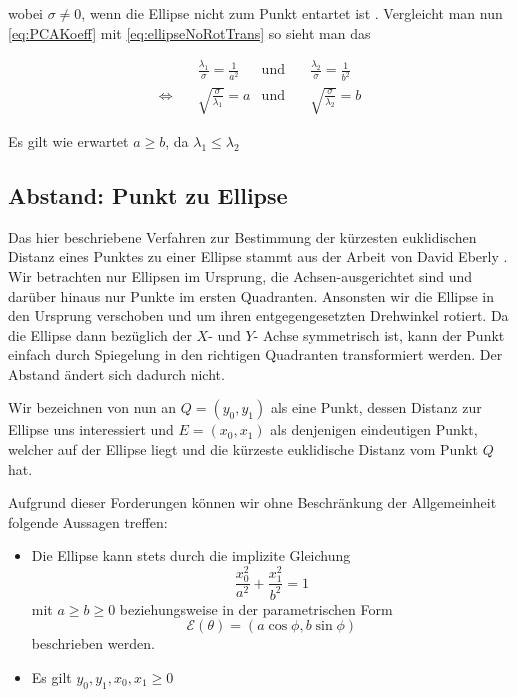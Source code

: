wobei $\sigma \neq 0$, wenn die Ellipse nicht zum Punkt entartet ist \cite{Lawrence1972}. Vergleicht man nun \ref{eq:PCAKoeff} mit \ref{eq:ellipseNoRotTrans} so sieht man das

\begin{equation}
\begin{aligned}
&\frac{\lambda_1}{\sigma} = \frac{1}{a^2} &\text{und}\quad &\frac{\lambda_2}{\sigma} = \frac{1}{b^2}\\
\Leftrightarrow\quad & \sqrt{\frac{\sigma}{\lambda_1}}  = a  &\text{und}\quad & \sqrt{\frac{\sigma}{\lambda_2}}  = b
\end{aligned}
\end{equation}

Es gilt wie erwartet $a \geq b$, da $\lambda_1 \leq \lambda_2$


\subsection{Abstand: Punkt zu Ellipse}
Das hier beschriebene Verfahren zur Bestimmung der kürzesten euklidischen Distanz eines Punktes zu einer Ellipse stammt aus der Arbeit von David Eberly \cite{Eberly2013}.
Wir betrachten nur Ellipsen im Ursprung, die Achsen-ausgerichtet sind und darüber hinaus nur Punkte im ersten Quadranten. Ansonsten wir die Ellipse in den Ursprung verschoben und um ihren entgegengesetzten Drehwinkel rotiert. Da die Ellipse dann bezüglich der $X$- und $Y$- Achse symmetrisch ist, kann der Punkt einfach durch Spiegelung in den richtigen Quadranten transformiert werden. Der Abstand ändert sich dadurch nicht. 

Wir bezeichnen von nun an $Q = (y_0, y_1)$ als eine Punkt, dessen Distanz zur Ellipse uns interessiert und $E = (x_0, x_1)$ als denjenigen eindeutigen Punkt, welcher auf der Ellipse liegt und die kürzeste euklidische Distanz vom Punkt $Q$ hat. 

Aufgrund dieser Forderungen können wir ohne Beschränkung der Allgemeinheit folgende Aussagen treffen:
\begin{itemize}
	\item Die Ellipse kann stets durch die implizite Gleichung \[\frac{x_0^2}{a^2} + \frac{x_1^2}{b^2} = 1\] mit $a \geq b \geq 0$ beziehungsweise
	in der parametrischen Form \[\mathcal{E}(\theta) = (a\cos\phi, b\sin\phi)  \tag*{$\phi \in [0, 2\pi)$}\] beschrieben werden.
	\item Es gilt $y_0,y_1,x_0, x_1 \geq 0$
\end{itemize}

